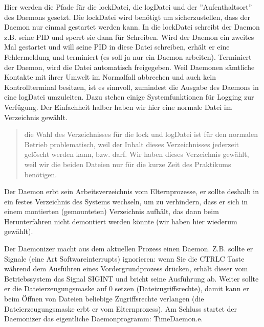 \documentclass[a4paper,10pt,english]{report}
\begin{document}
\sphinxAtStartPar
Hier werden die Pfade für die lock\sphinxhyphen{}Datei, die log\sphinxhyphen{}Datei und der ”Aufenthaltsort” des Daemons gesetzt. Die lock\sphinxhyphen{}Datei wird benötigt um sicherzustellen, dass der Daemon nur einmal gestartet werden kann. In die lock\sphinxhyphen{}Datei schreibt der Daemon z.B. seine PID und sperrt sie dann für Schreiben. Wird der Daemon ein zweites Mal gestartet und will seine PID in diese Datei schreiben, erhält er eine Fehlermeldung und terminiert (es soll ja nur ein Daemon arbeiten). Terminiert der Daemon, wird die Datei automatisch freigegeben. Weil Daemonen sämtliche Kontakte mit ihrer Umwelt im Normalfall abbrechen und auch kein Kontrollterminal besitzen, ist es sinnvoll, zumindest die Ausgabe des Daemons in eine log\sphinxhyphen{}Datei umzuleiten. Dazu stehen einige Systemfunktionen für Logging zur Verfügung. Der Einfachheit halber haben wir hier eine normale Datei im Verzeichnis  gewählt.
\begin{quote}

\sphinxAtStartPar
{} die Wahl des Verzeichnisses  für die lock\sphinxhyphen{} und log\sphinxhyphen{}Datei ist für den normalen Betrieb problematisch, weil der Inhalt dieses Verzeichnisses jederzeit gelöscht werden kann, bzw. darf. Wir haben dieses Verzeichnis gewählt, weil wir die beiden Dateien nur für die kurze Zeit des Praktikums benötigen.
\end{quote}

\sphinxAtStartPar
Der Daemon erbt sein Arbeitsverzeichnis vom Elternprozesse, er sollte deshalb in ein festes Verzeichnis des Systems wechseln, um zu verhindern, dass er sich in einem montierten (gemounteten) Verzeichnis aufhält, das dann beim Herunterfahren nicht demontiert werden könnte (wir haben hier wiederum  gewählt).

\sphinxAtStartPar
{}

\sphinxAtStartPar
Der Daemonizer macht aus dem aktuellen Prozess einen Daemon. Z.B. sollte er Signale (eine Art Softwareinterrupts) ignorieren: wenn Sie die CTRL\sphinxhyphen{}C Taste während dem Ausführen eines Vordergrundprozess drücken, erhält dieser vom Betriebssystem das Signal SIGINT und bricht seine Ausführung ab. Weiter sollte er die Dateierzeugungsmaske auf 0 setzen (Dateizugriffsrechte), damit kann er beim Öffnen von Dateien beliebige Zugriffsrechte verlangen (die Dateierzeugungsmaske erbt er vom Elternprozess). Am Schluss startet der Daemonizer das eigentliche Daemonprogramm: TimeDaemon.e.
\end{document}
